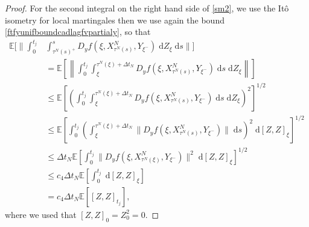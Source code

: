 \documentclass[reqno,12pt]{amsart}
\theoremstyle{plain} %
\theoremstyle{definition} %
\begin{document}
\begin{proof}
    For the second integral on the right hand side of \eqref{sm2}, we use the It\^o isometry for local martingales then we use again the bound \eqref{ftfyunifboundcadlagfvpartialy}, so that
    \begin{align*}
        \mathbb{E}\bigg[\bigg\|\int_0^{t_j} & \int_{\tau^N(s)^+}^s D_y f(\xi, X_{\tau^N(s)}^N, Y_{\xi^-}) \;\mathrm{d}Z_\xi\;\mathrm{d}s\bigg\|\bigg] \\
        & = \mathbb{E}\left[\left\|\int_0^{t_j} \int_{\xi}^{\tau^N(\xi) + \Delta t_N} D_y f(\xi, X_{\tau^N(s)}^N, Y_{\xi^-}) \;\mathrm{d}s \;\mathrm{d}Z_\xi\right\|\right] \\
        & \leq \mathbb{E}\left[\left(\int_0^{t_j} \int_{\xi}^{\tau^N(\xi) + \Delta t_N} D_y f(\xi, X_{\tau^N(s)}^N, Y_{\xi^-}) \;\mathrm{d}s \;\mathrm{d}Z_\xi\right)^2\right]^{1/2} \\
        & \leq \mathbb{E}\left[\int_0^{t_j} \left(\int_{\xi}^{\tau^N(\xi) + \Delta t_N} \|D_y f(\xi, X_{\tau^N(s)}^N, Y_{\xi^-})\| \;\mathrm{d}s\right)^2 \;\mathrm{d}[Z, Z]_\xi\right]^{1/2} \\
        & \leq \Delta t_N\mathbb{E}\left[\int_0^{t_j} \|D_y f(\xi, X_{\tau^N(\xi)}^N, Y_{\xi^-})\|^2 \;\mathrm{d}[Z, Z]_\xi\right]^{1/2} \\
        & \leq c_4\Delta t_N\mathbb{E}\left[\int_0^{t_j} \;\mathrm{d}[Z, Z]_\xi\right] \\
        & = c_4\Delta t_N\mathbb{E}\left[ [Z, Z]_{t_j}\right],
    \end{align*}
    where we used that $[Z, Z]_0 = Z_0^2 = 0.$


\end{proof}
\end{document}
